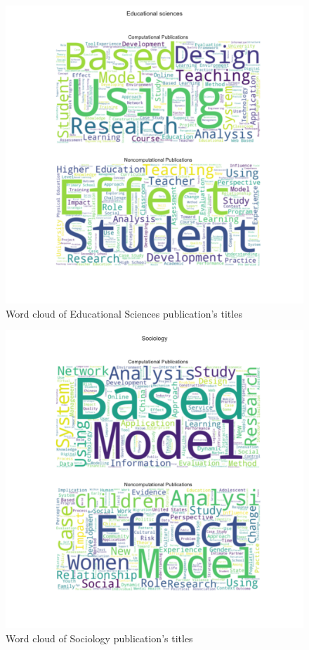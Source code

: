 \documentclass[12pt, a4paper]{article}
\begin{document}
\begin{figure}[H]
	\centering
	\includegraphics[width=\textwidth]{wc_Educational_Sciences}
	\caption{Word cloud of Educational Sciences publication's titles}
\end{figure}
\begin{figure}[H]
	\centering
	\includegraphics[width=\textwidth]{wc_Sociology}
	\caption{Word cloud of Sociology publication's titles}
\end{figure}
\end{document}
